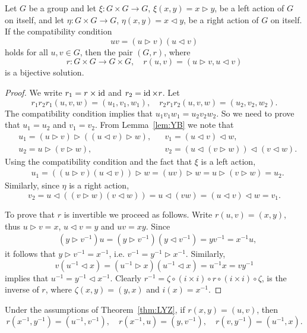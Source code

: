 \begin{theorem}
\label{thm:LYZ}
Let $G$ be a group and let $\xi\colon G\times G\to G$, $\xi(x,y)=x\rhd y$,
be a left action of $G$ on itself, and 
let $\eta\colon G\times G\to G$, $\eta(x,y)=x\lhd y$, 
be a right action of $G$ on itself. If the compatibility condition
\[
uv=(u\rhd v)(u\lhd v)
\]
holds for all $u,v\in G$, then the pair $(G,r)$, where 
\[
r\colon G\times G\to G\times G,\quad
r(u,v)=(u\rhd v,u\lhd v)
\]
is a bijective solution. 
\end{theorem}

\begin{proof}
We write $r_1=r\times\operatorname{id}$ and $r_2=\operatorname{id}\times r$. Let
\[
r_1r_2r_1(u,v,w)=(u_1,v_1,w_1),\quad
r_2r_1r_2(u,v,w)=(u_2,v_2,w_2).
\]
The compatibility condition implies that $u_1v_1w_1=u_2v_2w_2$. 
So we need to prove that $u_1=u_2$ and $v_1=v_2$. From Lemma~\ref{lem:YB}
we note that
\begin{align*}
&u_1=(u\rhd v)\rhd ( (u\lhd v)\rhd w),
&&v_1=(u\lhd v)\lhd w,\\
&u_2=u\rhd (v\rhd w),
&&v_2=(u\lhd (v\rhd w))\lhd (v\lhd w).
\end{align*}
Using the compatibility condition and the fact that $\xi$ is a left action, 
\begin{align*}
    &u_1=((u\rhd v)(u\lhd v))\rhd w=(uv)\rhd w=u\rhd (v\rhd w)=u_2.
\end{align*}
Similarly, since $\eta$ is a right action, 
\[
v_2=u\lhd ((v\rhd w)(v\lhd w))=u\lhd (vw)=(u\lhd v)\lhd w=v_1.
\]

To prove that $r$ is invertible we proceed as follows. 
Write $r(u,v)=(x,y)$, thus $u\rhd v=x$, $u\lhd v=y$ and $uv=xy$. Since 
\begin{align*}
& (y\rhd v^{-1})u=(y\rhd v^{-1})(y\lhd v^{-1})=yv^{-1}=x^{-1}u,
\end{align*}
it follows that $y\rhd v^{-1}=x^{-1}$, i.e. $v^{-1}=y^{-1}\rhd x^{-1}$. Similarly, 
\[
v(u^{-1}\lhd x)=(u^{-1}\rhd x)(u^{-1}\lhd x)=u^{-1}x=vy^{-1}
\]
implies that $u^{-1}=y^{-1}\lhd x^{-1}$. Clearly 
$r^{-1}=\zeta\circ (i\times i)\circ r\circ (i\times i)\circ \zeta$,
is the inverse of $r$, where $\zeta(x,y)=(y,x)$ and $i(x)=x^{-1}$. 
\end{proof}

\begin{proposition}
Under the assumptions of Theorem~\ref{thm:LYZ}, 
if $r(x,y)=(u,v)$, then 
\[
r(x^{-1},y^{-1})=(u^{-1},v^{-1}),
\quad
r(x^{-1},u)=(y,v^{-1}),
\quad
r(v,y^{-1})=(u^{-1},x).
\]
\end{proposition}

